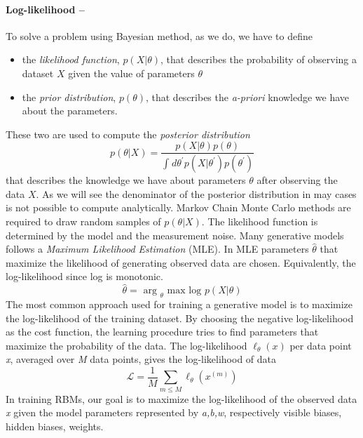 \documentclass[prl,twocolumn]{revtex4-1}
\begin{document}
\paragraph{\bf Log-likelihood --} To solve a problem using Bayesian method, as we do, we have to define
\begin{itemize}
	\item the \emph{likelihood function}, $p\left( X|\theta   \right)$, that describes the probability of observing a dataset $X$ given the value of parameters $\theta $
	\item the \emph{prior distribution}, $p\left( \theta  \right)$, that describes the \emph{a-priori} knowledge we have about the parameters.
\end{itemize}
These two are used to compute the \emph{posterior distribution}
\begin{equation}
p\left( \theta |X  \right) = \frac{p\left( X|\theta  \right)p\left( \theta  \right)}{\int_{}^{}{d\theta^{\prime } p\left( X|\theta ^{\prime } \right)p\left( \theta ^{\prime } \right)}}
\end{equation}
that describes the knowledge we have  about parameters $\theta $ after observing the data $X$. As we will see the denominator of the posterior distribution in may cases is not possible to compute analytically. Markov Chain Monte Carlo methods are required to draw random samples of $p\left( \theta |X \right)$.
The likelihood function is determined by the model and the measurement noise. Many generative models follows a \emph{Maximum Likelihood Estimation} (MLE). In MLE parameters $\hat{\theta }$ that maximize the likelihood of generating observed data are chosen. Equivalently, the log-likelihood since log is monotonic.
\begin{equation}
\hat{\theta } = \text{ arg }_{\theta } \text{ max log }p\left( X|\theta  \right)
\end{equation}
The most common approach used for training a generative model is to maximize the log-likelihood of the training dataset. By choosing the negative log-likelihood as the cost function, the learning procedure tries to find parameters that maximize the probability of the data.
The log-likelihood $\ell_{\theta }\left( x \right)$ per data point \emph{x}, averaged over \emph{M} data points, gives the log-likelihood of data
\begin{equation}
\mathcal{L} = \frac{1}{M} \sum_{m\leq M}^{}{\ell_{\theta }\left( x^{\left( m \right)} \right)}
\end{equation}\cite{mehta}
In training RBMs, our goal is to maximize the log-likelihood of the observed data \emph{x} given the model parameters represented by \emph{a,b,w}, respectively visible biases, hidden biases, weights.
\end{document}
